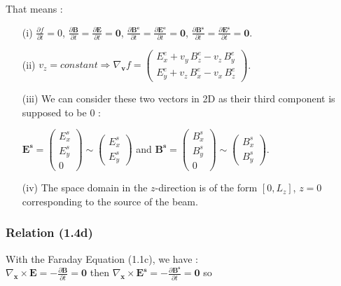 \documentclass[10pt]{article}
\newcommand{\D}{{\partial}}
\begin{document}
That means : \\

\begin{itemize}
\item[(i)] $\frac{\D f}{\D t} = 0$, $\frac{\D \mathbf{B}}{\D t} = \frac{\D \mathbf{E}}{\D t} = \mathbf{0}$, $\frac{\D \mathbf{B^{e}}}{\D t} = \frac{\D \mathbf{E^{e}}}{\D t} = \mathbf{0}$, $\frac{\D \mathbf{B^{s}}}{\D t} = \frac{\D \mathbf{E^{s}}}{\D t} = \mathbf{0}$.

\item[(ii)] $v_{z} = constant \Rightarrow \nabla_{\mathbf{v}}f = \left( \begin{array}{c}
E_{x}^{e} + v_{y}\,B_{z}^{e} - v_{z}\,B_{y}^{e} \\
E_{y}^{e} + v_{z}\,B_{x}^{e} - v_{x}\,B_{z}^{e}
\end{array} \right)$.
\item[(iii)] We can consider these two vectors in 2D as their third component is supposed to be 0 :

$\mathbf{E^s} = \left( \begin{array}{c}
E_x^s \\
E_y^s \\
0
\end{array} \right) \sim \left( \begin{array}{c}
E_x^s \\
E_y^s
\end{array} \right)$ and
$\mathbf{B^s} = \left( \begin{array}{c}
B_x^s \\
B_y^s \\
0
\end{array} \right) \sim \left( \begin{array}{c}
B_x^s \\
B_y^s
\end{array} \right) $.


\item[(iv)] The space domain in the $z$-direction is of the form $[0,L_{z}]$, $z = 0$ corresponding to the source of the beam. \\
\end{itemize}


\subsubsection{Relation (1.4d)}


With the Faraday Equation (1.1c), we have : \\
$\nabla_{\mathbf{x}} \times \mathbf{E} = - \frac{\D \mathbf{B}}{\D t} = \mathbf{0}$
then
$\nabla_{\mathbf{x}} \times \mathbf{E^s} = - \frac{\D \mathbf{B^s}}{\D t} = \mathbf{0}$ so \\
\end{document}
